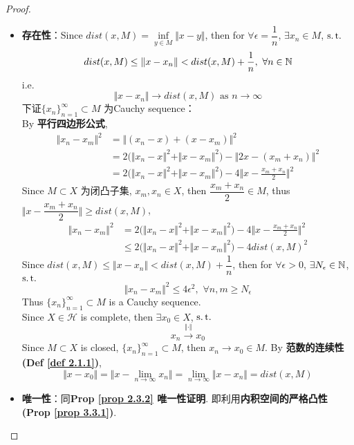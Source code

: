 \begin{thm}
		\begin{proof}
			\begin{itemize}
				\item \textbf{存在性}：Since $dist(x , M) = \underset{y \in M}{\inf} \Vert x - y \Vert$, then for $\forall \epsilon = \dfrac{1}{n}$, $\exists x_n \in M$, $\operatorname{s.t.}$
				\[ dist(x , M) \leq \Vert x - x_n \Vert < dist(x , M) + \frac{1}{n} , \,\, \forall n \in \mathbb{N} \]
				i.e. 
				\[ \Vert x - x_n \Vert \to dist(x , M) \,\, \text{as} \,\, n \to \infty \]
				下证$\{ x_n \}_{n = 1}^{\infty} \subset M$ 为Cauchy sequence：\\
				By \textbf{平行四边形公式}, 
				\begin{align}
					\Vert x_n - x_m \Vert^2 
					&= \Big\Vert \left( x_n - x \right) + \left( x - x_m \right) \Big\Vert^2 \\
					&= 2 \Big( \Vert x_n - x \Vert^2 + \Vert x - x_m \Vert^2 \Big) - \Big\Vert 2x - \left( x_m + x_n \right) \Big\Vert^2 \\
					&= 2 \Big( \Vert x_n - x \Vert^2 + \Vert x - x_m \Vert^2 \Big) - 4 \Big\Vert x - \frac{x_m + x_n}{2} \Big\Vert^2 
				\end{align}
				Since $M \subset X$ 为闭凸子集, $x_m , x_n \in X$, then $\dfrac{x_m + x_n}{2} \in M$, thus $\Big\Vert x - \dfrac{x_m + x_n}{2} \Big\Vert \geq dist(x , M)$, 
				\begin{align}
					\Vert x_n - x_m \Vert^2 
					&= 2 \Big( \Vert x_n - x \Vert^2 + \Vert x - x_m \Vert^2 \Big) - 4 \Big\Vert x - \frac{x_m + x_n}{2} \Big\Vert^2 \\
					&\leq 2 \Big( \Vert x_n - x \Vert^2 + \Vert x - x_m \Vert^2 \Big) - 4 dist(x , M)^2
				\end{align}
				Since $dist(x , M) \leq \Vert x - x_n \Vert < dist(x , M) + \dfrac{1}{n}$, then for $\forall \epsilon > 0$, $\exists N_\epsilon \in \mathbb{N}$, $\operatorname{s.t.}$
				\[ \Vert x_n - x_m \Vert^2 \leq 4\epsilon^2 , \,\, \forall n , m \geq N_\epsilon \]
				Thus $\{ x_n \}_{n = 1}^{\infty} \subset M$ is a Cauchy sequence. \\
				Since $X \in \mathcal{H}$ is complete, then $\exists x_0 \in X$, $\operatorname{s.t.}$
				\[ x_n \overset{\Vert \cdot \Vert}{\to} x_0 \]
				Since $M \subset X$ is closed, $\{ x_n \}_{n = 1}^{\infty} \subset M$, then $x_n \to x_0 \in M$. By \textbf{范数的连续性 (Def \ref{def 2.1.1})}, 
				\[ \Vert x - x_0 \Vert 
				= \Big\Vert x - \lim_{n \to \infty} x_n \Big\Vert 
				= \lim_{n \to \infty} \Vert x - x_n \Vert 
				= dist(x , M) \]
				
				\vspace{8em}
				
				\item \textbf{唯一性}：同\textbf{Prop \ref{prop 2.3.2} 唯一性证明}. 即利用\textbf{内积空间的严格凸性 (Prop \ref{prop 3.3.1})}.
			\end{itemize}
		\end{proof}
	\end{thm}


